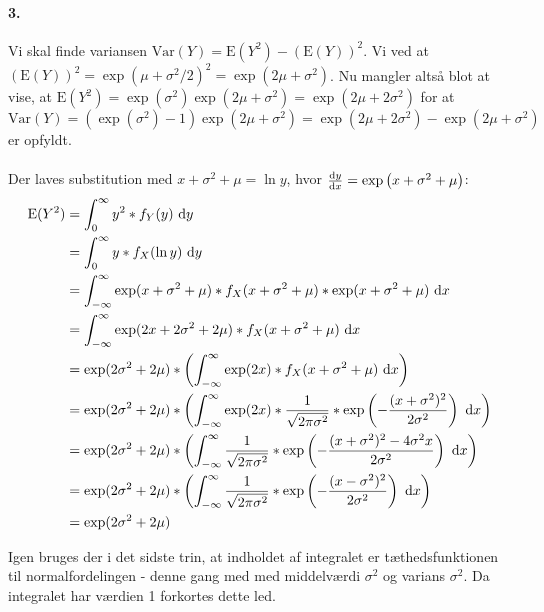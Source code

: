 \paragraph{3.} Vi skal finde variansen $\mathrm{Var}(Y) = \mathrm{E}(Y^2)
- (\mathrm{E}(Y))^2$. Vi ved at $(\mathrm{E}(Y))^2 = \exp(\mu+\sigma^2
/ 2)^2 = \exp(2\mu + \sigma^2)$. Nu mangler altså blot at vise, at
$\mathrm{E}(Y^2)=\exp(\sigma^2)\exp(2\mu+\sigma^2) = \exp(2\mu+ 2\sigma^2)$
for at $\mathrm{Var}(Y) = (\exp(\sigma^2) - 1)\exp(2\mu+\sigma^2) =
\exp(2\mu+2\sigma^2) - \exp(2\mu+\sigma^2)$ er opfyldt.\\
\\
Der laves substitution med $x + \sigma^2 + \mu = \ln y$, hvor
$\frac{\mathrm{d} y}{\mathrm{d} x} = \exp\left(x+\sigma^2 + \mu\right)$:
\begin{align*}
\mathrm{E}(Y^2)
&= \int_0^\infty y^2 * f_Y(y)\ \mathrm{d} y \\
&= \int_0^\infty y * f_X(\ln y)\ \mathrm{d} y \\
&= \int_{-\infty}^\infty
      \exp(x+\sigma^2 + \mu) *
       f_X(x+\sigma^2 + \mu) *
      \exp(x+\sigma^2 + \mu)
   \ \mathrm{d} x \\
&= \int_{-\infty}^\infty
      \exp(2x+2\sigma^2 + 2\mu) *
       f_X(x+\sigma^2 + \mu)
   \ \mathrm{d} x \\
&= \exp(2\sigma^2 + 2\mu) *
   \left(\int_{-\infty}^\infty
      \exp(2x) *
       f_X(x+\sigma^2 + \mu)
   \ \mathrm{d} x\right)\\
&= \exp(2\sigma^2 + 2\mu) *
   \left(\int_{-\infty}^\infty
      \exp(2x) *
      \frac{1}{\sqrt{2\pi\sigma^2}} *
      \exp\left(
        -\frac{(x+\sigma^2)^2}{2\sigma^2}
      \right)
   \ \mathrm{d} x\right)\\
&= \exp(2\sigma^2 + 2\mu) *
   \left(\int_{-\infty}^\infty
      \frac{1}{\sqrt{2\pi\sigma^2}} *
      \exp\left(
        -\frac{(x+\sigma^2)^2 - 4\sigma^2 x}{2\sigma^2}
      \right)
   \ \mathrm{d} x\right) \\
&= \exp(2\sigma^2 + 2\mu) *
   \left(\int_{-\infty}^\infty
      \frac{1}{\sqrt{2\pi\sigma^2}} *
      \exp\left(
        -\frac{(x-\sigma^2)^2}{2\sigma^2}
      \right)
   \ \mathrm{d} x\right) \\
&= \exp(2\sigma^2 + 2\mu)
\end{align*}

Igen bruges der i det sidste trin, at indholdet af integralet er
tæthedsfunktionen til normalfordelingen - denne gang med med middelværdi $\sigma^2$
og varians $\sigma^2$. Da integralet har værdien 1 forkortes dette led.

